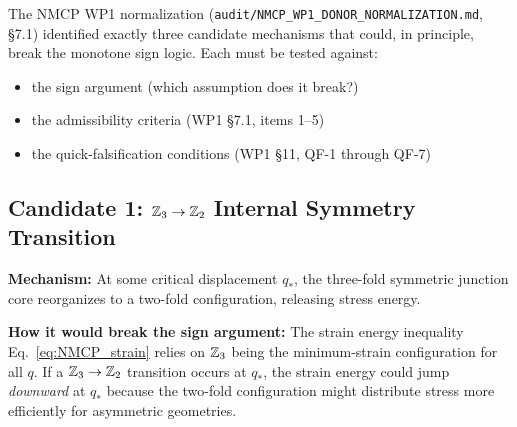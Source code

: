The NMCP WP1 normalization (\texttt{audit/NMCP\_WP1\_DONOR\_NORMALIZATION.md},
\S7.1) identified exactly three candidate mechanisms that could, in
principle, break the monotone sign logic. Each must be tested against:
\begin{itemize}
    \item[(A)] the sign argument (which assumption does it break?)
    \item[(B)] the admissibility criteria (WP1 \S7.1, items 1--5)
    \item[(C)] the quick-falsification conditions (WP1 \S11, QF-1 through QF-7)
\end{itemize}

\subsection{Candidate 1: $\mathbb{Z}_3 \to \mathbb{Z}_2$ Internal Symmetry Transition}

\textbf{Mechanism:} At some critical displacement $q_*$, the
three-fold symmetric junction core reorganizes to a two-fold
configuration, releasing stress energy.

\textbf{How it would break the sign argument:}
The strain energy inequality Eq.~\eqref{eq:NMCP_strain} relies on
$\mathbb{Z}_3$ being the minimum-strain configuration for all $q$. If
a $\mathbb{Z}_3 \to \mathbb{Z}_2$ transition occurs at $q_*$, the strain energy
could jump \emph{downward} at $q_*$ because the two-fold configuration
might distribute stress more efficiently for asymmetric geometries.

